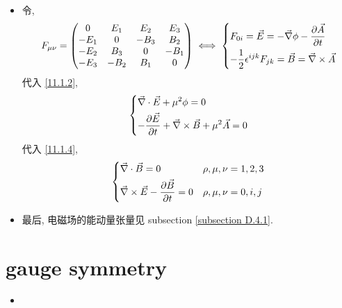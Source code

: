 \begin{itemize}
	\item 令,
	\begin{equation}
		F_{\mu \nu} = \begin{pmatrix}
			0 & E_1 & E_2 & E_3 \\
			- E_1 & 0 & - B_3 & B_2 \\
			- E_2 & B_3 & 0 & - B_1 \\
			- E_3 & - B_2 & B_1 & 0
		\end{pmatrix} \iff \begin{dcases}
			F_{0 i} = \vec{E} = - \vec{\nabla} \phi - \frac{\partial \vec{A}}{\partial t} \\
			- \frac{1}{2} \epsilon^{i j k} F_{j k} = \vec{B} = \vec{\nabla} \times \vec{A}
		\end{dcases}
	\end{equation}
	代入 \eqref{11.1.2},
	\begin{equation}
		\begin{dcases}
			\vec{\nabla} \cdot \vec{E} + \mu^2 \phi = 0 \\
			- \frac{\partial \vec{E}}{\partial t} + \vec{\nabla} \times \vec{B} + \mu^2 \vec{A} = 0
		\end{dcases}
	\end{equation}
	代入 \eqref{11.1.4},
	\begin{equation}
		\begin{dcases}
			\vec{\nabla} \cdot \vec{B} = 0 & \rho, \mu, \nu = 1, 2, 3 \\
			\vec{\nabla} \times \vec{E} - \frac{\partial \vec{B}}{\partial t} = 0 & \rho, \mu, \nu = 0, i, j
		\end{dcases}
	\end{equation}
	
	\item 最后, 电磁场的能动量张量见 subsection \ref{subsection D.4.1}.
\end{itemize}

\section{gauge symmetry}
\begin{itemize}
	\item 
\end{itemize}

